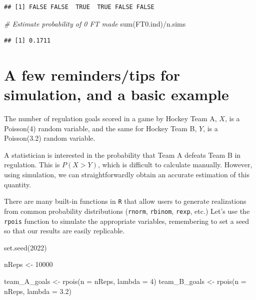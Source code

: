 \documentclass[
  11pt,
]{book}
\newenvironment{Shaded}{\begin{snugshade}}{\end{snugshade}}
\newcommand{\AttributeTok}[1]{\textcolor[rgb]{0.77,0.63,0.00}{#1}}
\newcommand{\CommentTok}[1]{\textcolor[rgb]{0.56,0.35,0.01}{\textit{#1}}}
\newcommand{\DecValTok}[1]{\textcolor[rgb]{0.00,0.00,0.81}{#1}}
\newcommand{\FloatTok}[1]{\textcolor[rgb]{0.00,0.00,0.81}{#1}}
\newcommand{\FunctionTok}[1]{\textcolor[rgb]{0.00,0.00,0.00}{#1}}
\newcommand{\NormalTok}[1]{#1}
\newcommand{\OtherTok}[1]{\textcolor[rgb]{0.56,0.35,0.01}{#1}}
\newcommand{\SpecialCharTok}[1]{\textcolor[rgb]{0.00,0.00,0.00}{#1}}
\theoremstyle{definition}
\theoremstyle{definition}
\theoremstyle{definition}
\theoremstyle{definition}
\theoremstyle{remark}
\begin{document}
\begin{verbatim}
## [1] FALSE FALSE  TRUE  TRUE FALSE FALSE
\end{verbatim}

\begin{Shaded}
\begin{Highlighting}[]
\CommentTok{\# Estimate probability of 0 FT made}
\FunctionTok{sum}\NormalTok{(FT0.ind)}\SpecialCharTok{/}\NormalTok{n.sims}
\end{Highlighting}
\end{Shaded}

\begin{verbatim}
## [1] 0.1711
\end{verbatim}

\hypertarget{a-few-reminderstips-for-simulation-and-a-basic-example}{%
\section{A few reminders/tips for simulation, and a basic example}\label{a-few-reminderstips-for-simulation-and-a-basic-example}}

The number of regulation goals scored in a game by Hockey Team A, \(X\), is a Poisson(4) random variable, and the same for Hockey Team B, \(Y\), is a Poisson(3.2) random variable.

A statistician is interested in the probability that Team A defeats Team B in regulation. This is \(P(X > Y)\), which is difficult to calculate manually. However, using simulation, we can straightforwardly obtain an accurate estimation of this quantity.

There are many built-in functions in \texttt{R} that allow users to generate realizations from common probability distributions (\texttt{rnorm}, \texttt{rbinom}, \texttt{rexp}, etc.) Let's use the \texttt{rpois} function to simulate the appropriate variables, remembering to set a seed so that our results are easily replicable.

\begin{Shaded}
\begin{Highlighting}[]
\FunctionTok{set.seed}\NormalTok{(}\DecValTok{2022}\NormalTok{)}

\NormalTok{nReps }\OtherTok{\textless{}{-}} \DecValTok{10000}

\NormalTok{team\_A\_goals }\OtherTok{\textless{}{-}} \FunctionTok{rpois}\NormalTok{(}\AttributeTok{n =}\NormalTok{ nReps, }\AttributeTok{lambda =} \DecValTok{4}\NormalTok{)}
\NormalTok{team\_B\_goals }\OtherTok{\textless{}{-}} \FunctionTok{rpois}\NormalTok{(}\AttributeTok{n =}\NormalTok{ nReps, }\AttributeTok{lambda =} \FloatTok{3.2}\NormalTok{)}
\end{Highlighting}
\end{Shaded}
\end{document}
